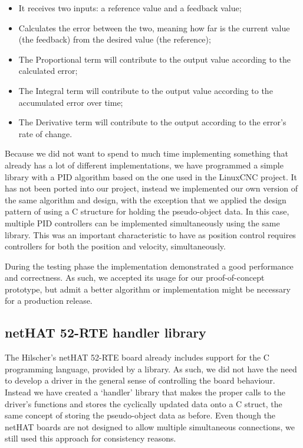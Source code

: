 \begin{itemize}
	\item It receives two inputs: a reference value and a feedback value;
	\item Calculates the error between the two, meaning how far is the current value (the feedback) from the desired value (the reference);
	\item The Proportional term will contribute to the output value according to the calculated error;
	\item The Integral term will contribute to the output value according to the accumulated error over time;
	\item The Derivative term will contribute to the output according to the error's rate of change.
\end{itemize}

Because we did not want to spend to much time implementing something that already has a lot of different implementations, we have programmed a simple library with a PID algorithm based on the one used in the LinuxCNC \cite{sw:linuxcnc} project.
It has not been ported into our project, instead we implemented our own version of the same algorithm and design, with the exception that we applied the design pattern of using a C structure for holding the pseudo-object data.
In this case, multiple PID controllers can be implemented simultaneously using the same library.
This was an important characteristic to have as position control requires controllers for both the position and velocity, simultaneously.

During the testing phase the implementation demonstrated a good performance and correctness.
As such, we accepted its usage for our proof-of-concept prototype, but admit a better algorithm or implementation might be necessary for a production release.

\subsection{netHAT 52-RTE handler library}
The Hilscher's netHAT 52-RTE board already includes support for the C programming language, provided by a library.
As such, we did not have the need to develop a driver in the general sense of controlling the board behaviour.
Instead we have created a `handler' library that makes the proper calls to the driver's functions and stores the cyclically updated data onto a C struct, the same concept of storing the pseudo-object data as before.
Even though the netHAT boards are not designed to allow multiple simultaneous connections, we still used this approach for consistency reasons.

